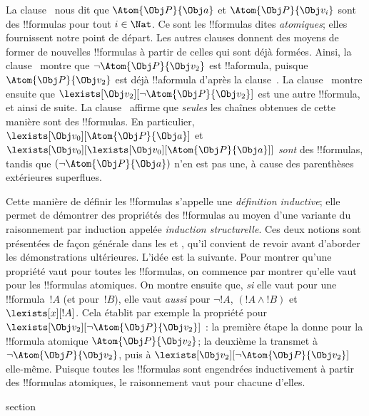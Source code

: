 \documentclass[11pt,a4paper,openany]{memoir}
\begin{document}
La clause~ nous dit que $\Atom{\Obj P}{\Obj a}$ et
$\Atom{\Obj P}{\Obj v_i}$ sont des !!{formula}s pour tout
$i \in \Nat$. Ce sont les !!{formula}s dites \emph{atomiques}; elles
fournissent notre point de départ. Les autres clauses donnent des
moyens de former de nouvelles !!{formula}s à partir de celles qui sont
déjà formées. Ainsi, la clause~ montre que
$\lnot \Atom{\Obj P}{\Obj v_2}$ est !!a{formula}, puisque
$\Atom{\Obj P}{\Obj v_2}$ est déjà !!a{formula} d'après la
clause~. La clause~ montre ensuite que
$\lexists[\Obj v_2][\lnot \Atom{\Obj P}{\Obj v_2}]$ est une autre
!!{formula}, et ainsi de suite. La clause~ affirme que
\emph{seules} les chaînes obtenues de cette manière sont des
!!{formula}s. En particulier,
$\lexists[\Obj v_0][\Atom{\Obj P}{\Obj a}]$ et
$\lexists[\Obj v_0][\lexists[\Obj v_0][\Atom{\Obj P}{\Obj a}]]$
\emph{sont} des !!{formula}s, tandis que
$(\lnot \Atom{\Obj P}{\Obj a})$ n'en est pas une, à cause des
parenthèses extérieures superflues.

Cette manière de définir les !!{formula}s s'appelle une
\emph{définition inductive}; elle permet de démontrer des propriétés des
!!{formula}s au moyen d'une variante du raisonnement par induction
appelée \emph{induction structurelle}. Ces deux notions sont présentées
de façon générale dans les  et
, qu'il convient de revoir avant d'aborder
les démonstrations ultérieures. L'idée est la suivante. Pour montrer
qu'une propriété vaut pour toutes les !!{formula}s, on commence par
montrer qu'elle vaut pour les !!{formula}s atomiques. On montre ensuite
que, \emph{si} elle vaut pour une !!{formula}~$!A$ (et pour~$!B$),
elle vaut \emph{aussi} pour $\lnot !A$, $(!A \land !B)$ et
$\lexists[x][!A]$. Cela établit par exemple la propriété pour
$\lexists[\Obj v_2][\lnot \Atom{\Obj P}{\Obj v_2}]$ : la première
étape la donne pour la !!{formula} atomique
$\Atom{\Obj P}{\Obj v_2}$; la deuxième la transmet à
$\lnot \Atom{\Obj P}{\Obj v_2}$, puis à
$\lexists[\Obj v_2][\lnot \Atom{\Obj P}{\Obj v_2}]$ elle-même.
Puisque toutes les !!{formula}s sont engendrées inductivement à partir
des !!{formula}s atomiques, le raisonnement vaut pour chacune d'elles.


\endgroup



\begingroup
\expandafter\def\csname ol@sectioncs\endcsname{section}
\def\olfilename{satisfaction}
\end{document}
